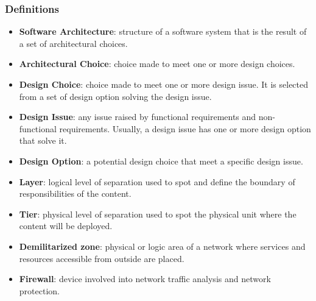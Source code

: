 \subsubsection{Definitions}

\begin{itemize}
	\item \textbf{Software Architecture}: structure of a software system that is the result of a set of architectural choices.
	\item \textbf{Architectural Choice}: choice made to meet one or more design choices.
	\item \textbf{Design Choice}: choice made to meet one or more design issue. It is selected from a set of design option solving the design issue.
	\item \textbf{Design Issue}: any issue raised by functional requirements and non-functional requirements. Usually, a design issue has one or more design option that solve it.
	\item \textbf{Design Option}: a potential design choice that meet a specific design issue.
	\item \textbf{Layer}: logical level of separation used to spot and define the boundary of responsibilities of the content.
	\item \textbf{Tier}: physical level of separation used to spot the physical unit where the content will be deployed.
	\item \textbf{Demilitarized zone}: physical or logic area of a network where services and resources accessible from outside are placed.
	\item \textbf{Firewall}: device involved into network traffic analysis and network protection.
\end{itemize}
